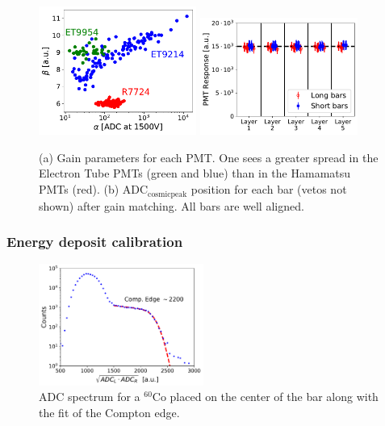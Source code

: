 \documentclass[3p,twocolumn]{elsarticle}
\begin{document}
\begin{figure}[th!]
	\centering
			\includegraphics[width=0.46\textwidth]{fig16a-gainspread.pdf}
			\subcaption{}
			\label{fig:gain}
			\includegraphics[width=0.46\textwidth]{fig16b-adcresponse.pdf}
			\subcaption{}
		\label{fig:hv_settings}
		\caption{ (a) Gain parameters for each PMT. One sees a greater spread in the Electron Tube PMTs (green and blue) than in the Hamamatsu PMTs (red). (b) $\mathrm{ADC}_{\mathrm{cosmic peak}}$ position for each bar (vetos not shown) after gain matching. All bars are well aligned.}
\end{figure}

\subsubsection{Energy deposit calibration}
\label{sec:energydeposit}
\begin{figure}[th!]
	\centering
		\includegraphics[width=0.48\textwidth]{fig17-cobaltfit.pdf}
		\caption{ADC spectrum for a $^{60}$Co placed on the center of the bar along with the fit of the Compton edge.}
	\label{fig:compton_edge}
\end{figure}
\end{document}
